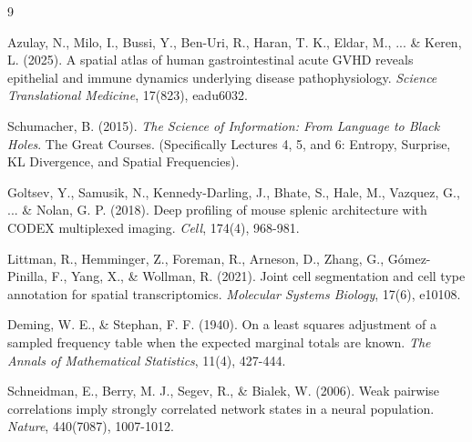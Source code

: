 \documentclass[10pt, a4paper]{article}
\begin{document}
\begin{thebibliography}{9}

Azulay, N., Milo, I., Bussi, Y., Ben-Uri, R., Haran, T. K., Eldar, M., ... \& Keren, L. (2025). A spatial atlas of human gastrointestinal acute GVHD reveals epithelial and immune dynamics underlying disease pathophysiology. \textit{Science Translational Medicine}, 17(823), eadu6032.

Schumacher, B. (2015). \textit{The Science of Information: From Language to Black Holes}. The Great Courses. (Specifically Lectures 4, 5, and 6: Entropy, Surprise, KL Divergence, and Spatial Frequencies).

Goltsev, Y., Samusik, N., Kennedy-Darling, J., Bhate, S., Hale, M., Vazquez, G., ... \& Nolan, G. P. (2018). Deep profiling of mouse splenic architecture with CODEX multiplexed imaging. \textit{Cell}, 174(4), 968-981.

Littman, R., Hemminger, Z., Foreman, R., Arneson, D., Zhang, G., Gómez-Pinilla, F., Yang, X., \& Wollman, R. (2021). Joint cell segmentation and cell type annotation for spatial transcriptomics. \textit{Molecular Systems Biology}, 17(6), e10108.

Deming, W. E., \& Stephan, F. F. (1940). On a least squares adjustment of a sampled frequency table when the expected marginal totals are known. \textit{The Annals of Mathematical Statistics}, 11(4), 427-444.

Schneidman, E., Berry, M. J., Segev, R., \& Bialek, W. (2006). Weak pairwise correlations imply strongly correlated network states in a neural population. \textit{Nature}, 440(7087), 1007-1012.

\end{thebibliography}
\end{document}

